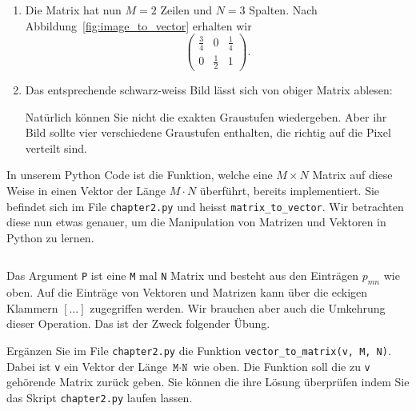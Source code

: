 \begin{losung}
	\begin{enumerate}[label=(\alph*)]
		\item Die Matrix hat nun $M=2$ Zeilen und $N=3$ Spalten. Nach Abbildung~\ref{fig:image_to_vector} erhalten wir
		\begin{equation*}
			\begin{pmatrix}
				\frac{3}{4} & 0 & \frac{1}{4} \\
				0 & \frac{1}{2} & 1
			\end{pmatrix}.
		\end{equation*}
		\item Das entsprechende schwarz-weiss Bild lässt sich von obiger Matrix ablesen:
		
		\begin{center}
		\end{center}

		Natürlich können Sie nicht die exakten Graustufen wiedergeben.
		Aber ihr Bild sollte vier verschiedene Graustufen enthalten, die richtig auf die Pixel verteilt sind.
	\end{enumerate}
\end{losung}
In unserem Python Code ist die Funktion, welche eine $M\times N$ Matrix auf diese Weise in einen Vektor der Länge $M\cdot N$ überführt, bereits implementiert.
Sie befindet sich im File \texttt{chapter2.py} und heisst \texttt{matrix\_to\_vector}.
Wir betrachten diese nun etwas genauer, um die Manipulation von Matrizen und Vektoren in Python zu lernen.
\inputminted[frame=single,framesep=5pt,firstline=12,lastline=17]{python}{codes/solution/chapter2.py}
Das Argument \texttt{P} ist eine \texttt{M} mal \texttt{N} Matrix und besteht aus den Einträgen $p_{mn}$ wie oben.
Auf die Einträge von Vektoren und Matrizen kann über die eckigen Klammern $[\ldots]$ zugegriffen werden.
Wir brauchen aber auch die Umkehrung dieser Operation.
Das ist der Zweck folgender Übung.
\begin{aufgabe} \label{aufg:vectormatrix_code}
	Ergänzen Sie im File \texttt{chapter2.py} die Funktion \texttt{vector\_to\_matrix(v, M, N)}.
	Dabei ist \texttt{v} ein Vektor der Länge $\texttt{M}\cdot\texttt{N}$ wie oben.
	Die Funktion soll die zu \texttt{v} gehörende Matrix zurück geben.
	Sie können die ihre Lösung überprüfen indem Sie das Skript \texttt{chapter2.py} laufen lassen.
\end{aufgabe}
